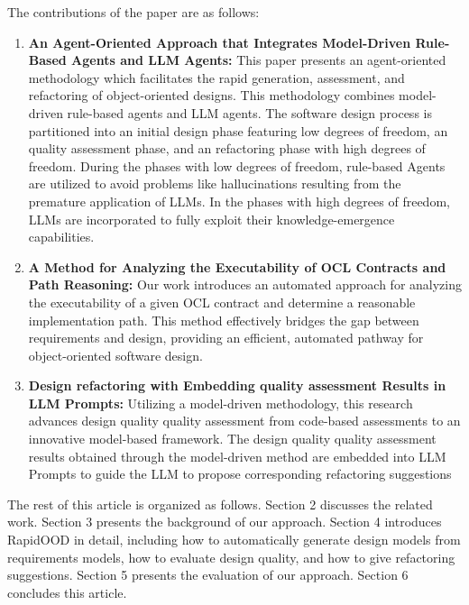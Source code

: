 \documentclass[pdflatex,sn-mathphys-num]{sn-jnl}%
\theoremstyle{thmstyleone}%
\theoremstyle{thmstyletwo}%
\theoremstyle{thmstylethree}%
\begin{document}
The contributions of the paper are as follows: 
\begin{enumerate}
     \item \textbf{An Agent-Oriented Approach that Integrates Model-Driven Rule-Based Agents and LLM Agents:} This paper presents an agent-oriented methodology which facilitates the rapid generation, assessment, and refactoring of object-oriented designs. This methodology combines model-driven rule-based agents and LLM agents. The software design process is partitioned into an initial design phase featuring low degrees of freedom, an quality assessment phase, and an refactoring phase with high degrees of freedom. During the phases with low degrees of freedom, rule-based Agents are utilized to avoid problems like hallucinations resulting from the premature application of LLMs. In the phases with high degrees of freedom, LLMs are incorporated to fully exploit their knowledge-emergence capabilities.
    \item \textbf{A Method for Analyzing the Executability of OCL Contracts and Path Reasoning:} Our work introduces an automated approach for analyzing the executability of a given OCL contract and determine a reasonable implementation path. This method effectively bridges the gap between requirements and design, providing an efficient, automated pathway for object-oriented software design.
    \item \textbf{Design refactoring with Embedding quality assessment Results in LLM Prompts:} Utilizing a model-driven methodology, this research advances design quality quality assessment from code-based assessments to an innovative model-based framework. The design quality quality assessment results obtained through the model-driven method are embedded into LLM Prompts to guide the LLM to propose corresponding refactoring suggestions
   
\end{enumerate}

The rest of this article is organized as follows. Section 2 discusses the related work. Section 3 presents the background of our approach. Section 4 introduces RapidOOD in detail, including how to automatically generate design models from requirements models, how to evaluate design quality, and how to give refactoring suggestions. Section 5 presents the evaluation of our approach. Section 6 concludes this article.
\end{document}
